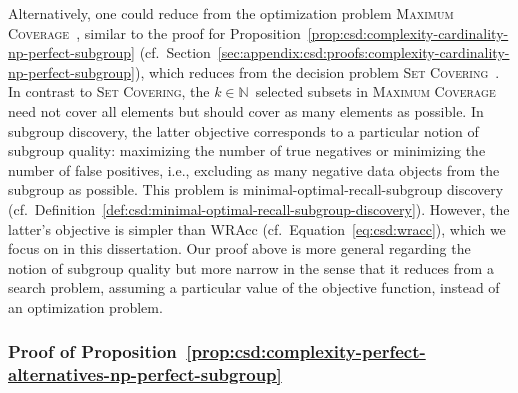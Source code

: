 %
Alternatively, one could reduce from the optimization problem \textsc{Maximum Coverage}~\cite{chekuri2004maximum}, similar to the proof for Proposition~\ref{prop:csd:complexity-cardinality-np-perfect-subgroup} (cf.~Section~\ref{sec:appendix:csd:proofs:complexity-cardinality-np-perfect-subgroup}), which reduces from the decision problem \textsc{Set Covering}~\cite{karp1972reducibility}.
In contrast to \textsc{Set Covering}, the $k \in \mathbb{N}$~selected subsets in \textsc{Maximum Coverage} need not cover all elements but should cover as many elements as possible.
In subgroup discovery, the latter objective corresponds to a particular notion of subgroup quality:
maximizing the number of true negatives or minimizing the number of false positives, i.e., excluding as many negative data objects from the subgroup as possible.
This problem is minimal-optimal-recall-subgroup discovery (cf.~Definition~\ref{def:csd:minimal-optimal-recall-subgroup-discovery}).
However, the latter's objective is simpler than WRAcc (cf.~Equation~\ref{eq:csd:wracc}), which we focus on in this dissertation.
Our proof above is more general regarding the notion of subgroup quality but more narrow in the sense that it reduces from a search problem, assuming a particular value of the objective function, instead of an optimization problem.

\subsubsection{Proof of Proposition~\ref{prop:csd:complexity-perfect-alternatives-np-perfect-subgroup}}
\label{sec:appendix:csd:proofs:complexity-perfect-alternatives-np-perfect-subgroup}

